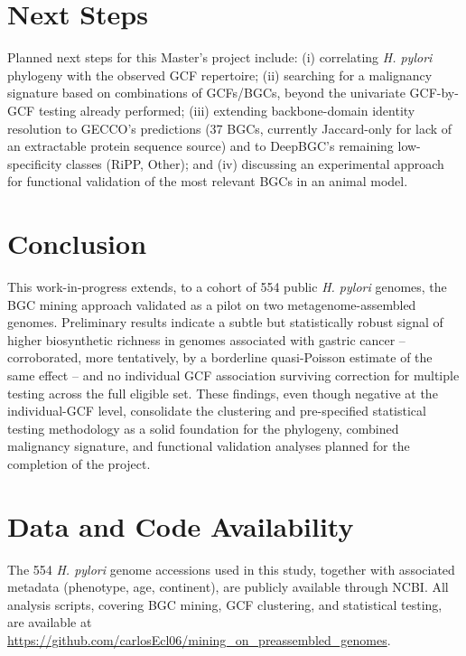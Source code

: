 \documentclass[12pt]{article}
\begin{document}
\section{Next Steps}

Planned next steps for this Master's project include: (i) correlating \textit{H. pylori} phylogeny with the observed GCF repertoire; (ii) searching for a malignancy signature based on combinations of GCFs/BGCs, beyond the univariate GCF-by-GCF testing already performed; (iii) extending backbone-domain identity resolution to GECCO's predictions (37 BGCs, currently Jaccard-only for lack of an extractable protein sequence source) and to DeepBGC's remaining low-specificity classes (RiPP, Other); and (iv) discussing an experimental approach for functional validation of the most relevant BGCs in an animal model.

\section{Conclusion}

This work-in-progress extends, to a cohort of 554 public \textit{H. pylori} genomes, the BGC mining approach validated as a pilot on two metagenome-assembled genomes. Preliminary results indicate a subtle but statistically robust signal of higher biosynthetic richness in genomes associated with gastric cancer -- corroborated, more tentatively, by a borderline quasi-Poisson estimate of the same effect -- and no individual GCF association surviving correction for multiple testing across the full eligible set. These findings, even though negative at the individual-GCF level, consolidate the clustering and pre-specified statistical testing methodology as a solid foundation for the phylogeny, combined malignancy signature, and functional validation analyses planned for the completion of the project.

\section{Data and Code Availability}

The 554 \textit{H. pylori} genome accessions used in this study, together with associated metadata (phenotype, age, continent), are publicly available through NCBI. All analysis scripts, covering BGC mining, GCF clustering, and statistical testing, are available at \url{https://github.com/carlosEcl06/mining_on_preassembled_genomes}.



\end{document}
